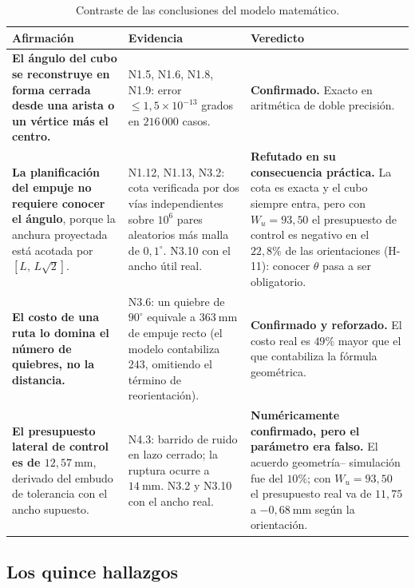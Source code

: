 \documentclass[11pt,a4paper]{article}
\newcommand{\grados}{^{\circ}}
\begin{document}
\begin{table}[htbp]
\centering
\small
\caption{Contraste de las conclusiones del modelo matemático.}
\begin{tabular}{p{5.6cm}p{4.1cm}p{4.6cm}}
\toprule
Afirmación & Evidencia & Veredicto \\
\midrule
\textbf{El ángulo del cubo se reconstruye en forma cerrada desde una arista o un
vértice más el centro.} &
N1.5, N1.6, N1.8, N1.9: error $\le 1{,}5\times10^{-13}$ grados en $216\,000$ casos. &
\textbf{Confirmado.} Exacto en aritmética de doble precisión. \\
\addlinespace
\textbf{La planificación del empuje no requiere conocer el ángulo}, porque la anchura
proyectada está acotada por $[L,\,L\sqrt2]$. &
N1.12, N1.13, N3.2: cota verificada por dos vías independientes sobre $10^6$ pares
aleatorios más malla de $0{,}1\grados$. N3.10 con el ancho útil real. &
\textbf{Refutado en su consecuencia práctica.} La cota es exacta y el cubo siempre entra,
pero con $W_u = 93{,}50$ el presupuesto de control es negativo en el $22{,}8\%$ de las
orientaciones (H-11): conocer $\theta$ pasa a ser obligatorio. \\
\addlinespace
\textbf{El costo de una ruta lo domina el número de quiebres, no la distancia.} &
N3.6: un quiebre de $90\grados$ equivale a $363\ \mathrm{mm}$ de empuje recto
(el modelo contabiliza $243$, omitiendo el término de reorientación). &
\textbf{Confirmado y reforzado.} El costo real es $49\%$ mayor que el que contabiliza la
fórmula geométrica. \\
\addlinespace
\textbf{El presupuesto lateral de control es de $12{,}57\ \mathrm{mm}$}, derivado del
embudo de tolerancia con el ancho supuesto. &
N4.3: barrido de ruido en lazo cerrado; la ruptura ocurre a $14\ \mathrm{mm}$. N3.2 y
N3.10 con el ancho real. &
\textbf{Numéricamente confirmado, pero el parámetro era falso.} El acuerdo geometría--
simulación fue del $10\%$; con $W_u = 93{,}50$ el presupuesto real va de $11{,}75$ a
$-0{,}68\ \mathrm{mm}$ según la orientación. \\
\bottomrule
\end{tabular}
\end{table}

\subsection{Los quince hallazgos}
\end{document}
